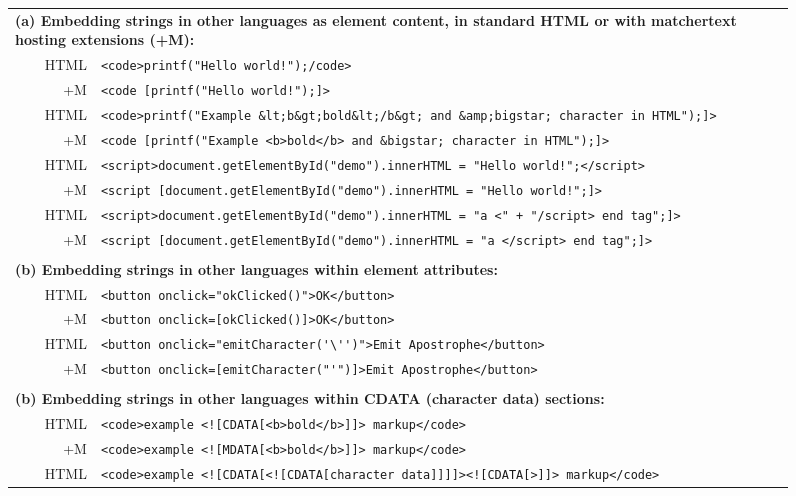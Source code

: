 \begin{figure*}
\begin{center}
\begin{footnotesize}
\begin{tabular}{lrl}
\multicolumn{3}{l}{\textbf{(a) Embedding strings in other languages as element content, in standard HTML or with matchertext hosting extensions (+M):}} \\
& HTML	& \verb|<code>printf("Hello world!");/code>| \\
& +M	& \verb|<code [printf("Hello world!");]>| \\
& HTML	& \verb|<code>printf("Example &lt;b&gt;bold&lt;/b&gt; and &amp;bigstar; character in HTML");]>| \\
& +M	& \verb|<code [printf("Example <b>bold</b> and &bigstar; character in HTML");]>| \\
& HTML	& \verb|<script>document.getElementById("demo").innerHTML = "Hello world!";</script>| \\
& +M	& \verb|<script [document.getElementById("demo").innerHTML = "Hello world!";]>| \\
& HTML	& \verb|<script>document.getElementById("demo").innerHTML = "a <" + "/script> end tag";]>| \\
& +M	& \verb|<script [document.getElementById("demo").innerHTML = "a </script> end tag";]>| \\
\\
\multicolumn{3}{l}{\textbf{(b) Embedding strings in other languages within element attributes:}} \\
& HTML	& \verb|<button onclick="okClicked()">OK</button>| \\
& +M	& \verb|<button onclick=[okClicked()]>OK</button>| \\
& HTML	& \verb|<button onclick="emitCharacter('\'')">Emit Apostrophe</button>| \\
& +M	& \verb|<button onclick=[emitCharacter("'")]>Emit Apostrophe</button>| \\
\\
\multicolumn{3}{l}{\textbf{(b) Embedding strings in other languages within CDATA (character data) sections:}} \\
& HTML	& \verb|<code>example <![CDATA[<b>bold</b>]]> markup</code>| \\
& +M	& \verb|<code>example <![MDATA[<b>bold</b>]]> markup</code>| \\
& HTML	& \verb|<code>example <![CDATA[<![CDATA[character data]]]]><![CDATA[>]]> markup</code>| \\

\end{tabular}
\end{footnotesize}
\end{center}
\end{figure*}
